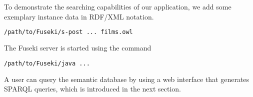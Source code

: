 To demonstrate the searching capabilities of our application, we add some exemplary instance data in RDF/XML notation.
\begin{lstlisting}[language=bash]
/path/to/Fuseki/s-post ... films.owl
\end{lstlisting}

The Fuseki server is started using the command
\begin{lstlisting}[language=bash]
/path/to/Fuseki/java ...
\end{lstlisting}

A user can query the semantic database by using a web interface that generates SPARQL queries, which is introduced in the next section.
